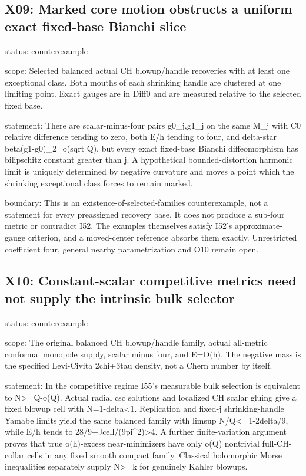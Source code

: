 \documentclass[
  10pt,
]{article}
\begin{document}
\hypertarget{x09-marked-core-motion-obstructs-a-uniform-exact-fixed-base-bianchi-slice}{%
\subsection{X09: Marked core motion obstructs a uniform exact fixed-base
Bianchi
slice}\label{x09-marked-core-motion-obstructs-a-uniform-exact-fixed-base-bianchi-slice}}

status: counterexample

scope: Selected balanced actual CH blowup/handle recoveries with at
least one exceptional class. Both mouths of each shrinking handle are
clustered at one limiting point. Exact gauges are in Diff0 and are
measured relative to the selected fixed base.

statement: There are scalar-minus-four pairs g0\_j,g1\_j on the same
M\_j with C0 relative difference tending to zero, both E/h tending to
four, and \textbar\textbar delta-star
beta(g1-g0)\textbar\textbar\_2=o(sqrt Q), but every exact fixed-base
Bianchi diffeomorphism has bilipschitz constant greater than j. A
hypothetical bounded-distortion harmonic limit is uniquely determined by
negative curvature and moves a point which the shrinking exceptional
class forces to remain marked.

boundary: This is an existence-of-selected-families counterexample, not
a statement for every preassigned recovery base. It does not produce a
sub-four metric or contradict I52. The examples themselves satisfy I52's
approximate-gauge criterion, and a moved-center reference absorbs them
exactly. Unrestricted coefficient four, general nearby parametrization
and O10 remain open.

\hypertarget{x10-constant-scalar-competitive-metrics-need-not-supply-the-intrinsic-bulk-selector}{%
\subsection{X10: Constant-scalar competitive metrics need not supply the
intrinsic bulk
selector}\label{x10-constant-scalar-competitive-metrics-need-not-supply-the-intrinsic-bulk-selector}}

status: counterexample

scope: The original balanced CH blowup/handle family, actual all-metric
conformal monopole supply, scalar minus four, and E=O(h). The negative
mass is the specified Levi-Civita 2chi+3tau density, not a Chern number
by itself.

statement: In the competitive regime I55's measurable bulk selection is
equivalent to N\textgreater=Q-o(Q). Actual radial csc solutions and
localized CH scalar gluing give a fixed blowup cell with
N=1-delta\textless1. Replication and fixed-j shrinking-handle Yamabe
limits yield the same balanced family with limsup
N/Q\textless=1-2delta/9, while E/h tends to
28/9+Jcell/(9pi\^{}2)\textgreater4. A further finite-variation argument
proves that true o(h)-excess near-minimizers have only o(Q) nontrivial
full-CH-collar cells in any fixed smooth compact family. Classical
holomorphic Morse inequalities separately supply N\textgreater=k for
genuinely Kahler blowups.
\end{document}
